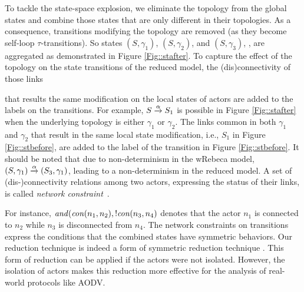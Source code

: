 To tackle the state-space explosion, we eliminate the topology from the global states and combine those states that are only different in their topologies. As a consequence, transitions modifying the topology are removed (as they become self-loop $\tau$-transitions). So states $(S,\gamma_1)$, $(S,\gamma_2)$, and $(S,\gamma_3)$, 
, are aggregated as demonstrated in Figure \ref{Fig::stafter}. %
To capture the effect of the topology on the state transitions of the reduced model, the (dis)connectivity of those links

that results the same modification on the local states of actors %
are added to the labels on the transitions. For example, $S\overto{\alpha} S_1$ is possible in Figure \ref{Fig::stafter} when the underlying topology is either $\gamma_1$ or $\gamma_2$. The links common in both $\gamma_{1}$ and $\gamma_{2}$ that result in the same local state modification, i.e., $S_1$ in Figure \ref{Fig::stbefore}, are added to the label of the transition in Figure \ref{Fig::stbefore}. 
%
It should be noted that due to non-determinism in the wRebeca model, $(S,\gamma_1)\overto{\alpha}(S_3,\gamma_1)$, leading to a non-determinism in the reduced model. 
A set of (dis-)connectivity relations among two actors, expressing the status of their links, is called \emph{network constraint}~\cite{FatemehFI10,FatemehFI19}. 

For instance, ${\it and}({\it con}(n_1,n_2),!{\it con}(n_3,n_4)$ denotes that the actor  $n_1$ is connected to $n_2$ while $n_3$ is disconnected from $n_4$. The network constraints on transitions express the conditions that the combined states have symmetric behaviors.  Our reduction technique is indeed a form of symmetric reduction technique \cite{clarke1998symmetry}. This form of reduction can be applied if the actors were not isolated. %
However, the isolation of actors makes this reduction more effective for the analysis of real-world protocols like AODV. 



